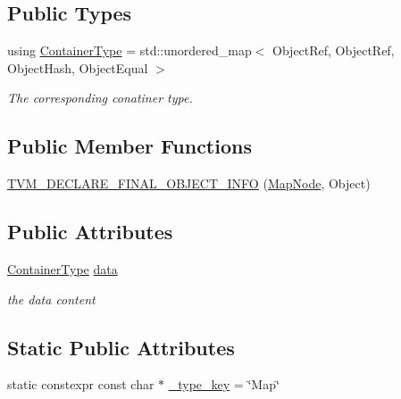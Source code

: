 \subsection*{Public Types}
\begin{DoxyCompactItemize}
\item 
using \hyperlink{classtvm_1_1MapNode_a0d54038e74462216ea11a3a64ff694cd}{Container\+Type} = std\+::unordered\+\_\+map$<$ Object\+Ref, Object\+Ref, Object\+Hash, Object\+Equal $>$
\begin{DoxyCompactList}\small\item\em The corresponding conatiner type. \end{DoxyCompactList}\end{DoxyCompactItemize}
\subsection*{Public Member Functions}
\begin{DoxyCompactItemize}
\item 
\hyperlink{classtvm_1_1MapNode_a7fed8c5725846061ba2b8bb92e5e9b6d}{T\+V\+M\+\_\+\+D\+E\+C\+L\+A\+R\+E\+\_\+\+F\+I\+N\+A\+L\+\_\+\+O\+B\+J\+E\+C\+T\+\_\+\+I\+N\+FO} (\hyperlink{classtvm_1_1MapNode}{Map\+Node}, Object)
\end{DoxyCompactItemize}
\subsection*{Public Attributes}
\begin{DoxyCompactItemize}
\item 
\hyperlink{classtvm_1_1MapNode_a0d54038e74462216ea11a3a64ff694cd}{Container\+Type} \hyperlink{classtvm_1_1MapNode_a5fe08f7ea603500f5f7ccc7e69979c78}{data}
\begin{DoxyCompactList}\small\item\em the data content \end{DoxyCompactList}\end{DoxyCompactItemize}
\subsection*{Static Public Attributes}
\begin{DoxyCompactItemize}
\item 
static constexpr const char $\ast$ \hyperlink{classtvm_1_1MapNode_a789b3b6435184c1e01e6cb7e97e5e37d}{\+\_\+type\+\_\+key} = \char`\"{}Map\char`\"{}
\end{DoxyCompactItemize}


